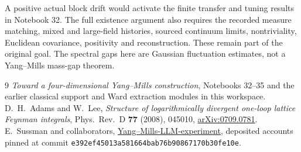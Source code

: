 A positive actual block drift would activate the finite transfer
and tuning results in Notebook 32. The full existence argument also
requires the recorded measure matching, mixed and large-field
histories, sourced continuum limits, nontriviality, Euclidean
covariance, positivity and reconstruction. These remain part of the
original goal. The spectral gaps here are Gaussian fluctuation
estimates, not a Yang--Mills mass-gap theorem.

\begin{thebibliography}{9}
\emph{Toward a four-dimensional Yang--Mills construction},
Notebooks 32--35 and the earlier classical support and Ward
extraction modules in this workspace.
D.~H.~Adams and W.~Lee,
\emph{Structure of logarithmically divergent one-loop lattice
Feynman integrals}, Phys.\ Rev.\ D \textbf{77} (2008), 045010,
\href{https://arxiv.org/abs/0709.0781}{arXiv:0709.0781}.
E.~Sussman and collaborators,
\href{https://github.com/ethanwsussman/Yang--Mills-LLM-experiment}
{Yang--Mills-LLM-experiment}, deposited accounts pinned at
commit \texttt{e392ef45013a581664bab76b90867170b30fe10e}.
\end{thebibliography}

